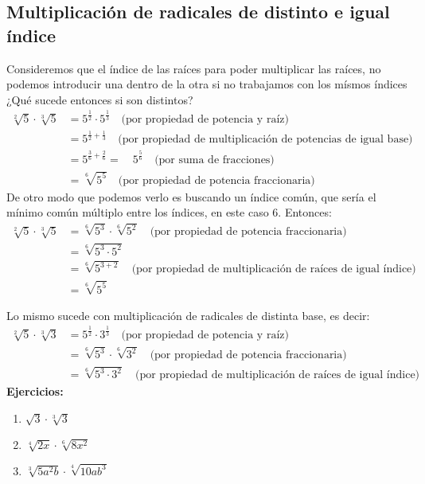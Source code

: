\documentclass[a4paper]{article}
\begin{document}
\subsection{Multiplicación de radicales de distinto e igual índice}
Consideremos que el índice de las raíces para poder multiplicar las raíces, no podemos introducir una dentro de la otra si no trabajamos con los mísmos índices ¿Qué sucede entonces si son distintos?
\begin{align*}
    \sqrt[2]{5} \cdot \sqrt[3]{5} &= 5^{\frac{1}{2}} \cdot 5^{\frac{1}{3}} \quad \text{(por propiedad de potencia y raíz)}\\
    &= 5^{\frac{1}{2}+\frac{1}{3}} \quad \text{(por propiedad de multiplicación de potencias de igual base)}\\
    &= 5^{\frac{3}{6}+\frac{2}{6}}=\quad 5^{\frac{5}{6}} \quad \text{(por suma de fracciones)}\\
    &= \sqrt[6]{5^5} \quad \text{(por propiedad de potencia fraccionaria)}
\end{align*}
De otro modo que podemos verlo es buscando un índice común, que sería el mínimo común múltiplo entre los índices, en este caso $6$. Entonces:
\begin{align*}
    \sqrt[2]{5} \cdot \sqrt[3]{5} &= \sqrt[6]{5^3} \cdot \sqrt[6]{5^2} \quad \text{(por propiedad de potencia fraccionaria)}\\
    &= \sqrt[6]{5^3\cdot 5^2}\\
    &= \sqrt[6]{5^{3+2}} \quad \text{(por propiedad de multiplicación de raíces de igual índice)}\\
    &= \sqrt[6]{5^5}
\end{align*}

Lo mismo sucede con multiplicación de radicales de distinta base, es decir:
\begin{align*}
    \sqrt[2]{5} \cdot \sqrt[3]{3} &= 5^{\frac{1}{2}} \cdot 3^{\frac{1}{3}} \quad \text{(por propiedad de potencia y raíz)}\\
    &= \sqrt[6]{5^3} \cdot \sqrt[6]{3^2} \quad \text{(por propiedad de potencia fraccionaria)}\\
    &= \sqrt[6]{5^3\cdot 3^2} \quad \text{(por propiedad de multiplicación de raíces de igual índice)}
\end{align*}
\textbf{Ejercicios:}
\begin{enumerate}
    \item $\sqrt{3}\cdot \sqrt[3]{3}$
    \item $\sqrt[4]{2x}\cdot \sqrt[6]{8x^2}$
    \item $\sqrt[3]{5a^2b}\cdot \sqrt[4]{10ab^3}$
\end{enumerate}
\end{document}
